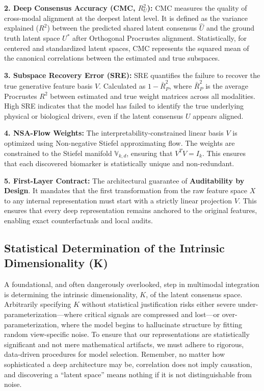 \documentclass[
  letterpaper,
]{report}
\begin{document}
\textbf{2. Deep Consensus Accuracy (CMC, \(R^2_U\)):} CMC measures the
quality of cross-modal alignment at the deepest latent level. It is
defined as the variance explained (\(R^2\)) between the predicted shared
latent consensus \(\hat{U}\) and the ground truth latent space \(U^*\)
after Orthogonal Procrustes alignment. Statistically, for centered and
standardized latent spaces, CMC represents the squared mean of the
canonical correlations between the estimated and true subspaces.

\textbf{3. Subspace Recovery Error (SRE):} SRE quantifies the failure to
recover the true generative feature basis \(V\). Calculated as
\(1 - \bar{R}^2_P\), where \(\bar{R}^2_P\) is the average Procrustes
\(R^2\) between estimated and true weight matrices across all
modalities. High SRE indicates that the model has failed to identify the
true underlying physical or biological drivers, even if the latent
consensus \(U\) appears aligned.

\textbf{4. NSA-Flow Weights:} The interpretability-constrained linear
basis \(V\) is optimized using Non-negative Stiefel approximating flow.
The weights are constrained to the Stiefel manifold
\(\mathbb{V}_{k,d}\), ensuring that \(V^T V = I_k\). This ensures that
each discovered biomarker is statistically unique and non-redundant.

\textbf{5. First-Layer Contract:} The architectural guarantee of
\textbf{Auditability by Design}. It mandates that the first
transformation from the raw feature space \(X\) to any internal
representation must start with a strictly linear projection \(V\). This
ensures that every deep representation remains anchored to the original
features, enabling exact counterfactuals and local audits.

\subsection{Statistical Determination of the Intrinsic Dimensionality
(K)}\label{statistical-determination-of-the-intrinsic-dimensionality-k}

A foundational, and often dangerously overlooked, step in multimodal
integration is determining the intrinsic dimensionality, \(K\), of the
latent consensus space. Arbitrarily specifying \(K\) without statistical
justification risks either severe under-parameterization---where
critical signals are compressed and lost---or over-parameterization,
where the model begins to hallucinate structure by fitting random
view-specific noise. To ensure that our representations are
statistically significant and not mere mathematical artifacts, we must
adhere to rigorous, data-driven procedures for model selection.
Remember, no matter how sophisticated a deep architecture may be,
correlation does not imply causation, and discovering a ``latent space''
means nothing if it is not distinguishable from noise.
\end{document}
